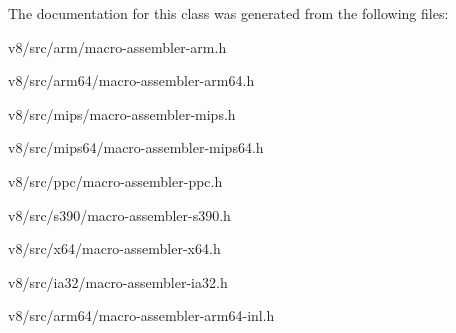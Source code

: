The documentation for this class was generated from the following files\+:\begin{DoxyCompactItemize}
\item 
v8/src/arm/macro-\/assembler-\/arm.\+h\item 
v8/src/arm64/macro-\/assembler-\/arm64.\+h\item 
v8/src/mips/macro-\/assembler-\/mips.\+h\item 
v8/src/mips64/macro-\/assembler-\/mips64.\+h\item 
v8/src/ppc/macro-\/assembler-\/ppc.\+h\item 
v8/src/s390/macro-\/assembler-\/s390.\+h\item 
v8/src/x64/macro-\/assembler-\/x64.\+h\item 
v8/src/ia32/macro-\/assembler-\/ia32.\+h\item 
v8/src/arm64/macro-\/assembler-\/arm64-\/inl.\+h\end{DoxyCompactItemize}
